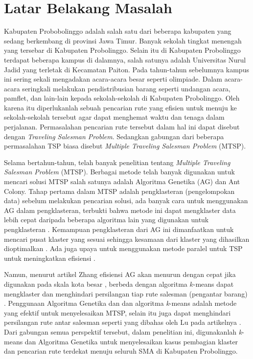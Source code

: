 \section{Latar Belakang Masalah}

Kabupaten Probobolinggo adalah salah satu dari beberapa kabupaten yang sedang berkembang di provinsi Jawa Timur. Banyak sekolah tingkat menengah yang tersebar di Kabupaten Probolinggo. Selain itu di Kabupaten Probolinggo terdapat beberapa kampus di dalamnya, salah satunya adalah Universitas Nurul Jadid yang terletak di Kecamatan Paiton. Pada tahun-tahun sebelumnya kampus ini sering sekali mengadakan acara-acara besar seperti olimpiade. Dalam acara-acara seringkali melakukan pendistribusian barang seperti undangan acara, pamflet, dan lain-lain kepada sekolah-sekolah di Kabupaten Probolinggo. Oleh karena itu diperlukanlah sebuah pencarian rute yang efisien untuk menuju ke sekolah-sekolah tersebut agar dapat menghemat waktu dan tenaga dalam perjalanan. Permasalahan pencarian rute tersebut dalam hal ini dapat disebut dengan \textit{Traveling Salesman Problem}. Sedangkan gabungan dari beberapa permasalahan TSP biasa disebut \textit{Multiple Traveling Salesman Problem} (MTSP).

Selama bertahun-tahun, telah banyak penelitian tentang \textit{Multiple Traveling Salesman Problem} (MTSP). Berbagai metode telah banyak digunakan untuk mencari solusi MTSP salah satunya adalah Algoritma Genetika (AG) dan Ant Colony. Tahap pertama dalam MTSP adalah pengklasteran (pengelompokan data) sebelum melakukan pencarian solusi, ada banyak cara untuk menggunakan AG dalam pengklasteran, terbukti bahwa metode ini dapat mengklaster data lebih cepat daripada beberapa algoritma lain yang digunakan untuk pengklasteran \cite{krishna1999genetic}. Kemampuan pengklasteran dari AG ini dimanfaatkan untuk mencari pusat klaster yang sesuai sehingga kesamaan dari klaster yang dihasilkan dioptimalkan \cite{maii2000genetic}. Ada juga upaya untuk menggunakan metode paralel untuk TSP untuk meningkatkan efisiensi \cite{li2016parallel}.

Namun, menurut artikel Zhang efisiensi AG akan menurun dengan cepat jika digunakan pada skala kota besar \cite{zhang2014parallel}, berbeda dengan algoritma $k$-means dapat mengklaster dan menghindari persilangan tiap rute salesman (pengantar barang) \cite{inproceedings}. Penggunaan Algoritma Genetika dan dan algoritma \textit{k}-means adalah metode yang efektif untuk menyelesaikan MTSP, selain itu juga dapat menghindari persilangan rute antar salesman seperti yang dibahas oleh Lu pada artikelnya \cite{inproceedings}. Dari gabungan semua perspektif tersebut, dalam penelitian ini, digunakanlah \textit{k}-means dan Algoritma Genetika untuk menyelesaikan kasus pembagian klaster dan pencarian rute terdekat menuju seluruh SMA di Kabupaten Probolinggo.